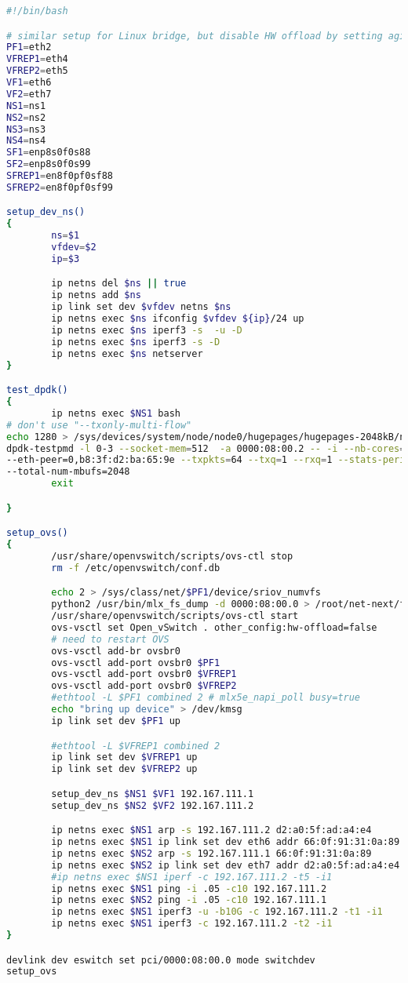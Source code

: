 \begin{lstlisting}[language=sh, caption={Bash Script for Database Backup}, label={lst:bash_script}]
#!/bin/bash

# similar setup for Linux bridge, but disable HW offload by setting aging=0
PF1=eth2
VFREP1=eth4
VFREP2=eth5
VF1=eth6
VF2=eth7
NS1=ns1
NS2=ns2
NS3=ns3
NS4=ns4
SF1=enp8s0f0s88
SF2=enp8s0f0s99
SFREP1=en8f0pf0sf88
SFREP2=en8f0pf0sf99

setup_dev_ns()
{
        ns=$1
        vfdev=$2
        ip=$3

        ip netns del $ns || true
        ip netns add $ns
        ip link set dev $vfdev netns $ns
        ip netns exec $ns ifconfig $vfdev ${ip}/24 up
        ip netns exec $ns iperf3 -s  -u -D
        ip netns exec $ns iperf3 -s -D
        ip netns exec $ns netserver
}

test_dpdk()
{
        ip netns exec $NS1 bash
# don't use "--txonly-multi-flow"
echo 1280 > /sys/devices/system/node/node0/hugepages/hugepages-2048kB/nr_hugepages
dpdk-testpmd -l 0-3 --socket-mem=512  -a 0000:08:00.2 -- -i --nb-cores=1 --forward-mode=txonly \
--eth-peer=0,b8:3f:d2:ba:65:9e --txpkts=64 --txq=1 --rxq=1 --stats-period=1 --txonly-multi-flow \
--total-num-mbufs=2048
        exit

}

setup_ovs()
{
        /usr/share/openvswitch/scripts/ovs-ctl stop
        rm -f /etc/openvswitch/conf.db

        echo 2 > /sys/class/net/$PF1/device/sriov_numvfs
        python2 /usr/bin/mlx_fs_dump -d 0000:08:00.0 > /root/net-next/fdb.txt
        /usr/share/openvswitch/scripts/ovs-ctl start
        ovs-vsctl set Open_vSwitch . other_config:hw-offload=false 
        # need to restart OVS
        ovs-vsctl add-br ovsbr0
        ovs-vsctl add-port ovsbr0 $PF1
        ovs-vsctl add-port ovsbr0 $VFREP1
        ovs-vsctl add-port ovsbr0 $VFREP2
        #ethtool -L $PF1 combined 2 # mlx5e_napi_poll busy=true
        echo "bring up device" > /dev/kmsg
        ip link set dev $PF1 up

        #ethtool -L $VFREP1 combined 2
        ip link set dev $VFREP1 up
        ip link set dev $VFREP2 up

        setup_dev_ns $NS1 $VF1 192.167.111.1
        setup_dev_ns $NS2 $VF2 192.167.111.2

        ip netns exec $NS1 arp -s 192.167.111.2 d2:a0:5f:ad:a4:e4
        ip netns exec $NS1 ip link set dev eth6 addr 66:0f:91:31:0a:89
        ip netns exec $NS2 arp -s 192.167.111.1 66:0f:91:31:0a:89
        ip netns exec $NS2 ip link set dev eth7 addr d2:a0:5f:ad:a4:e4
        #ip netns exec $NS1 iperf -c 192.167.111.2 -t5 -i1
        ip netns exec $NS1 ping -i .05 -c10 192.167.111.2
        ip netns exec $NS2 ping -i .05 -c10 192.167.111.1
        ip netns exec $NS1 iperf3 -u -b10G -c 192.167.111.2 -t1 -i1
        ip netns exec $NS1 iperf3 -c 192.167.111.2 -t2 -i1
}

devlink dev eswitch set pci/0000:08:00.0 mode switchdev
setup_ovs
\end{lstlisting}
